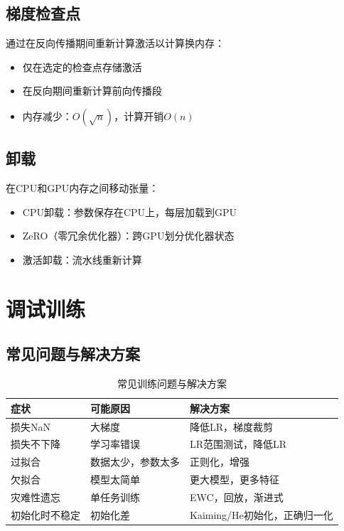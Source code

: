 \subsection{梯度检查点}

通过在反向传播期间重新计算激活以计算换内存：
\begin{itemize}
    \item 仅在选定的检查点存储激活
    \item 在反向期间重新计算前向传播段
    \item 内存减少：$O(\sqrt{n})$，计算开销$O(n)$
\end{itemize}

\subsection{卸载}

在CPU和GPU内存之间移动张量：
\begin{itemize}
    \item CPU卸载：参数保存在CPU上，每层加载到GPU
    \item ZeRO（零冗余优化器）：跨GPU划分优化器状态
    \item 激活卸载：流水线重新计算
\end{itemize}

\section{调试训练}

\subsection{常见问题与解决方案}

\begin{table}[ht]
    \centering
    \caption{常见训练问题与解决方案}
    \begin{tabular}{L{3cm} L{4cm} L{4cm}}
        \toprule
        \textbf{症状} & \textbf{可能原因} & \textbf{解决方案} \\
        \midrule
        损失NaN & 大梯度 & 降低LR，梯度裁剪 \\
        损失不下降 & 学习率错误 & LR范围测试，降低LR \\
        过拟合 & 数据太少，参数太多 & 正则化，增强 \\
        欠拟合 & 模型太简单 & 更大模型，更多特征 \\
        灾难性遗忘 & 单任务训练 & EWC，回放，渐进式 \\
        初始化时不稳定 & 初始化差 & Kaiming/He初始化，正确归一化 \\
        \bottomrule
    \end{tabular}
\end{table}


